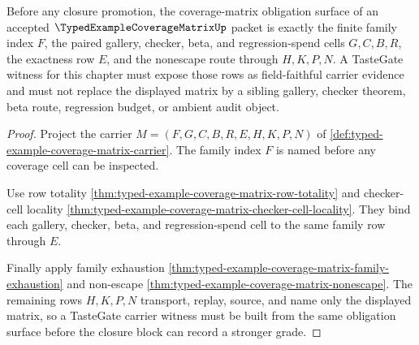 \begin{theorem}
\label{thm:typed-example-coverage-matrix-tastegate-obligation-surface}
Before any closure promotion, the coverage-matrix obligation surface of an accepted $\TypedExampleCoverageMatrixUp$ packet is exactly the finite family index $F$, the paired gallery, checker, beta, and regression-spend cells $G,C,B,R$, the exactness row $E$, and the nonescape route through $H,K,P,N$. A TasteGate witness for this chapter must expose those rows as field-faithful carrier evidence and must not replace the displayed matrix by a sibling gallery, checker theorem, beta route, regression budget, or ambient audit object.
\end{theorem}
\begin{proof}
Project the carrier $M=(F,G,C,B,R,E,H,K,P,N)$ of \autoref{def:typed-example-coverage-matrix-carrier}. The family index $F$ is named before any coverage cell can be inspected.

Use row totality \autoref{thm:typed-example-coverage-matrix-row-totality} and checker-cell locality \autoref{thm:typed-example-coverage-matrix-checker-cell-locality}. They bind each gallery, checker, beta, and regression-spend cell to the same family row through $E$.

Finally apply family exhaustion \autoref{thm:typed-example-coverage-matrix-family-exhaustion} and non-escape \autoref{thm:typed-example-coverage-matrix-nonescape}. The remaining rows $H,K,P,N$ transport, replay, source, and name only the displayed matrix, so a TasteGate carrier witness must be built from the same obligation surface before the closure block can record a stronger grade.
\end{proof}

